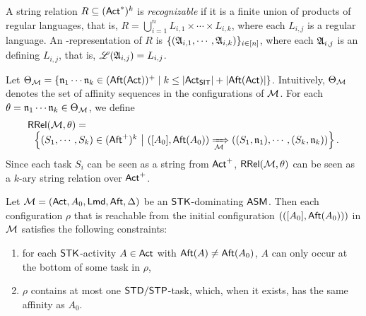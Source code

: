 \begin{definition}
A string relation $R \subseteq ({\sf Act}^*)^k$ is \emph{recognizable}  if it is a finite union of products of regular languages, that is, $R=\bigcup \limits_{i =1 }^n L_{i,1} \times \cdots \times L_{i, k}$, where each $L_{i,j}$ is a regular language. An {\NFA}-representation of $R$ is $\{({\mathfrak{A} }_{i,1},\cdots,{\mathfrak{A} }_{i,k})\}_{i\in[n]}$, where each ${\mathfrak{A} }_{i,j}$ is an {\NFA} defining $L_{i,j}$, that is, ${\mathscr{L} }({\mathfrak{A} }_{i,j}) = L_{i,j}$.
\end{definition}


Let $\Theta_{\mathcal{M} } = \left \{ \mathfrak{n}_1 \cdots \mathfrak{n}_k \in ({\sf Aft}({\sf Act}))^+ \mid k \le |{\sf Act}_{{\sf SIT}}| + |{\sf Aft}({\sf Act})| \right\}$. Intuitively, $\Theta_{\mathcal{M} }$ denotes the set of affinity sequences  in the configurations of ${\mathcal{M} }$. For each $\theta=\mathfrak{n}_1 \cdots \mathfrak{n}_k \in \Theta_{\mathcal{M} }$, we define 
%
$$
\begin{array}{l}
\mathsf{RRel}({\mathcal{M} }, \theta) = \\
\ \ \left\{(S_1, \cdots, S_k) \in ({\sf Aft}^+)^k\ \big{\vert}\  ([A_0], {\sf Aft}(A_0)) \xRightarrow[{\mathcal{M} }]{} ((S_1, \mathfrak{n}_1), \cdots, (S_k, \mathfrak{n}_k)) \right\}.
\end{array}
$$ 
%
Since each task $S_i$ can be seen as a string from ${\sf Act}^+$, $\mathsf{RRel}({\mathcal{M} }, \theta)$ can be seen as a $k$-ary string relation over ${\sf Act}^+$. 




\begin{proposition}\label{prop-stk}
	Let ${\mathcal{M} }=({\sf Act},A_0,{\sf Lmd},{\sf Aft},\Delta)$ be an $\mathsf{STK}$-dominating $\textsf{ASM}$. Then each configuration $\rho$ that is reachable from the initial configuration $(([A_0],{\sf Aft}(A_0)))$ in ${\mathcal{M} }$ satisfies the following constraints:
	\begin{enumerate}
		\item for each $\mathsf{STK}$-activity $A\in{\sf Act}$ with ${\sf Aft}(A)\neq{\sf Aft}(A_0)$, $A$ can only occur at the bottom of some task in $\rho$, 
		\item $\rho$ contains at most one ${\sf STD}/{\sf STP}$-task, which, when it exists, has the same affinity as $A_0$.
	\end{enumerate}
\end{proposition}


